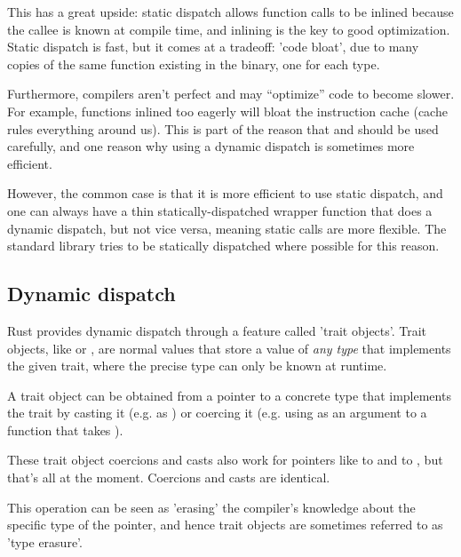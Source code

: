 This has a great upside: static dispatch allows function calls to be inlined because the callee is known at compile time, and inlining is the 
key to good optimization. Static dispatch is fast, but it comes at a tradeoff: 'code bloat', due to many copies of the same function existing 
in the binary, one for each type.

\blank

Furthermore, compilers aren't perfect and may \enquote{optimize} code to become slower. For example, functions inlined too eagerly will bloat 
the instruction cache (cache rules everything around us). This is part of the reason that \code{\#[inline]} and  
should be used carefully, and one reason why using a dynamic dispatch is sometimes more efficient.

\blank

However, the common case is that it is more efficient to use static dispatch, and one can always have a thin statically-dispatched wrapper 
function that does a dynamic dispatch, but not vice versa, meaning static calls are more flexible. The standard library tries to be 
statically dispatched where possible for this reason.

\subsection*{Dynamic dispatch}

Rust provides dynamic dispatch through a feature called 'trait objects'. Trait objects, like  or , are normal 
values that store a value of \emph{any type} that implements the given trait, where the precise type can only be known at runtime.

\blank

A trait object can be obtained from a pointer to a concrete type that implements the trait by casting it (e.g.  as ) 
or coercing it (e.g. using  as an argument to a function that takes ).

\blank

These trait object coercions and casts also work for pointers like  to  and  to , 
but that's all at the moment. Coercions and casts are identical.

\blank

This operation can be seen as 'erasing' the compiler's knowledge about the specific type of the pointer, and hence trait objects are 
sometimes referred to as 'type erasure'.

